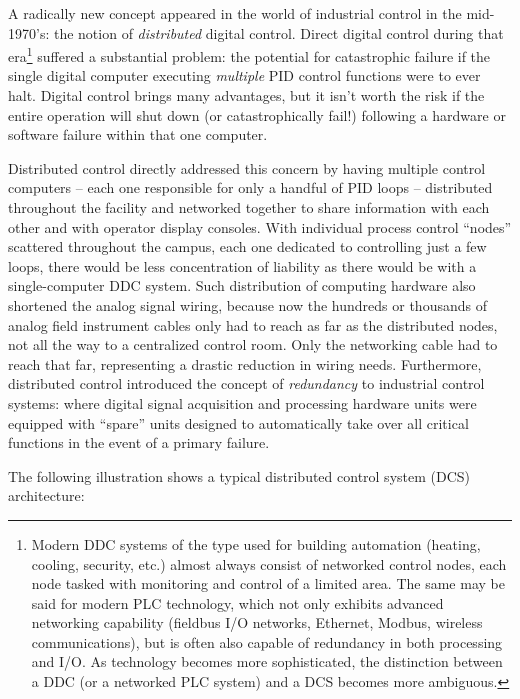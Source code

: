 A radically new concept appeared in the world of industrial control in the mid-1970's: the notion of \textit{distributed} digital control.  Direct digital control during that era\footnote{Modern DDC systems of the type used for building automation (heating, cooling, security, etc.) almost always consist of networked control nodes, each node tasked with monitoring and control of a limited area.  The same may be said for modern PLC technology, which not only exhibits advanced networking capability (fieldbus I/O networks, Ethernet, Modbus, wireless communications), but is often also capable of redundancy in both processing and I/O.  As technology becomes more sophisticated, the distinction between a DDC (or a networked PLC system) and a DCS becomes more ambiguous.} suffered a substantial problem: the potential for catastrophic failure if the single digital computer executing \textit{multiple} PID control functions were to ever halt.  Digital control brings many advantages, but it isn't worth the risk if the entire operation will shut down (or catastrophically fail!) following a hardware or software failure within that one computer.  

Distributed control directly addressed this concern by having multiple control computers -- each one responsible for only a handful of PID loops -- distributed throughout the facility and networked together to share information with each other and with operator display consoles.  With individual process control ``nodes'' scattered throughout the campus, each one dedicated to controlling just a few loops, there would be less concentration of liability as there would be with a single-computer DDC system.  Such distribution of computing hardware also shortened the analog signal wiring, because now the hundreds or thousands of analog field instrument cables only had to reach as far as the distributed nodes, not all the way to a centralized control room.  Only the networking cable had to reach that far, representing a drastic reduction in wiring needs.  Furthermore, distributed control introduced the concept of \textit{redundancy} to industrial control systems: where digital signal acquisition and processing hardware units were equipped with ``spare'' units designed to automatically take over all critical functions in the event of a primary failure.  

\filbreak

The following illustration shows a typical distributed control system (DCS) architecture:    

